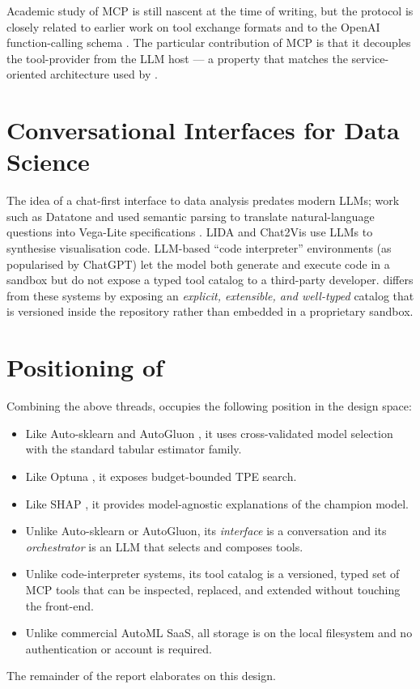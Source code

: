 Academic study of MCP is still nascent at the time of writing, but
the protocol is closely related to earlier work on tool exchange
formats \citep{schick2023toolformer, patil2023gorilla} and to the
OpenAI function-calling schema \citep{openai2023function}. The
particular contribution of MCP is that it decouples the
tool-provider from the LLM host --- a property that matches the
service-oriented architecture used by \projname.

\section{Conversational Interfaces for Data Science}
\label{sec:lit-convo}

The idea of a chat-first interface to data analysis predates modern
LLMs; work such as Datatone \citep{gao2015datatone} and
\citet{narechania2020nl4dv} used semantic parsing to translate
natural-language questions into Vega-Lite specifications
\citep{satyanarayan2016vega}. LIDA \citep{dibia2023lida} and Chat2Vis
\citep{maddigan2023chat2vis} use LLMs to synthesise visualisation
code. LLM-based ``code interpreter'' environments (as popularised by
ChatGPT) let the model both generate and execute code in a sandbox
but do not expose a typed tool catalog to a third-party developer.
\projname{} differs from these systems by exposing an
\emph{explicit, extensible, and well-typed} catalog that is versioned
inside the repository rather than embedded in a proprietary sandbox.

\section{Positioning of \projname}
\label{sec:lit-position}

Combining the above threads, \projname{} occupies the following
position in the design space:

\begin{itemize}[leftmargin=1.4em]
  \item Like Auto-sklearn \citep{feurer2015autosklearn} and AutoGluon
        \citep{erickson2020autogluon}, it uses cross-validated model
        selection with the standard tabular estimator family.
  \item Like Optuna \citep{akiba2019optuna}, it exposes budget-bounded
        TPE search.
  \item Like SHAP \citep{lundberg2017shap}, it provides model-agnostic
        explanations of the champion model.
  \item Unlike Auto-sklearn or AutoGluon, its \emph{interface} is a
        conversation and its \emph{orchestrator} is an LLM that
        selects and composes tools.
  \item Unlike code-interpreter systems, its tool catalog is a
        versioned, typed set of MCP tools that can be inspected,
        replaced, and extended without touching the front-end.
  \item Unlike commercial AutoML SaaS, all storage is on the local
        filesystem and no authentication or account is required.
\end{itemize}

The remainder of the report elaborates on this design.
